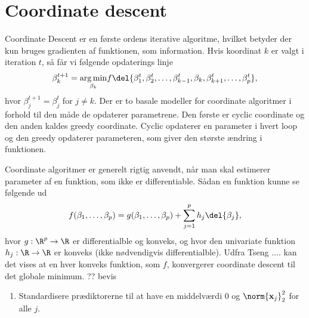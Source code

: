 \section{Coordinate descent}
Coordinate Descent er en første ordens iterative algoritme, hvilket betyder der kun bruges gradienten af funktionen, som information. 
Hvis koordinat $k$ er valgt i iteration $t$, så får vi følgende opdaterings linje
\begin{align*}
\beta_k^{t+1} =\underset{ \beta_k}{\arg \min}  f\del{ \beta_1^t, \beta_2^t, \dots, \beta_{k-1}^t, \beta_k, \beta_{k+1}^t, \dots, \beta_p^t  },
\end{align*}
hvor $\beta_j^{t+1} = \beta_j^t$ for $j \neq k$. 
Der er to basale modeller for coordinate algoritmer i forhold til den måde de opdaterer parametrene. Den første er cyclic coordinate og den anden kaldes greedy coordinate. 
Cyclic opdaterer en parameter i hvert loop og den greedy opdaterer parameteren, som giver den største ændring i funktionen. 

Coordinate algoritmer er generelt rigtig anvendt, når man skal estimerer parameter af en funktion, som ikke er differentiable. Sådan en funktion kunne se følgende ud
\begin{align*}
f(\beta_1, \dots, \beta_p) = g(\beta_1, \dots, \beta_p) + \sum_{j = 1}^p h_j \del{\beta_j},
\end{align*}
hvor $g: \R^p \rightarrow \R $ er differentialble og konveks, og hvor den univariate funktion $h_j : \R \rightarrow \R$ er konveks (ikke nødvendigvis differentialble). Udfra Tseng .... kan det vises at en hver konveks funktion, som $f$, konvergerer coordinate descent til det globale minimum. 
?? bevis
 
 
\begin{alg} 
\begin{enumerate}
%
\item Standardisere prædiktorerne til at have en middelværdi 0 og $\norm{\textbf{x}_j}_2^2$ for alle $j$.
\end{enumerate}
\end{alg}
